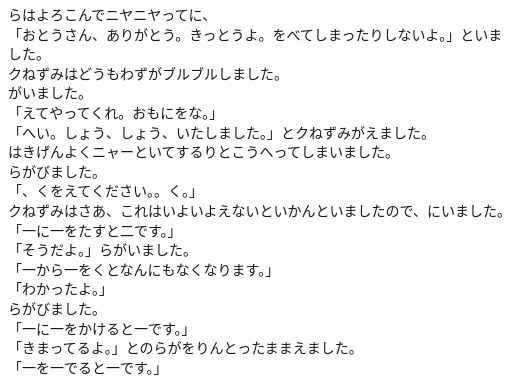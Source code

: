 \documentclass[
a4paper,
10pt,
book]
{tarticle}
\begin{document}
\indent {}らはよろこんでニヤニヤってに、\\
「おとうさん、ありがとう。きっとうよ。をべてしまったりしないよ。」といました。\\
\indent クねずみはどうもわずがブルブルしました。\\
\indent {}がいました。\\
「えてやってくれ。おもにをな。」\\
「へい。しょう、しょう、いたしました。」とクねずみがえました。\\
\indent {}はきげんよくニャーといてするりとこうへってしまいました。\\
\indent {}らがびました。\\
「、くをえてください。。く。」\\
\indent クねずみはさあ、これはいよいよえないといかんといましたので、にいました。\\
「一に一をたすと二です。」\\
「そうだよ。」らがいました。\\
「一から一をくとなんにもなくなります。」\\
「わかったよ。」\\
\indent {}らがびました。\\
「一に一をかけると一です。」\\
「きまってるよ。」とのらがをりんとったままえました。\\
「一を一でると一です。」
\end{document}
